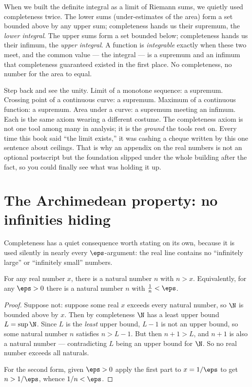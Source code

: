 When we built the definite integral as a limit of Riemann sums, we quietly used
completeness twice. The lower sums (under-estimates of the area) form a set bounded above
by any upper sum; completeness hands us their supremum, the \emph{lower integral}. The
upper sums form a set bounded below; completeness hands us their infimum, the \emph{upper
integral}. A function is \emph{integrable} exactly when these two meet, and the common
value --- the integral --- is a supremum and an infimum that completeness guaranteed
existed in the first place. No completeness, no number for the area to equal.

\begin{aestheticbox}
Step back and see the unity. Limit of a monotone sequence: a supremum. Crossing point of a
continuous curve: a supremum. Maximum of a continuous function: a supremum. Area under a
curve: a supremum meeting an infimum. Each is the same axiom wearing a different costume.
The completeness axiom is not one tool among many in analysis; it is the \emph{ground} the
tools rest on. Every time this book said ``the limit exists,'' it was cashing a cheque
written by this one sentence about ceilings. That is why an appendix on the real numbers is
not an optional postscript but the foundation slipped under the whole building after the
fact, so you could finally see what was holding it up.
\end{aestheticbox}

\section{The Archimedean property: no infinities hiding}
\label{ch41:archimedean}

Completeness has a quiet consequence worth stating on its own, because it is used silently
in nearly every $\eps$-argument: the real line contains no ``infinitely large'' or
``infinitely small'' numbers.

\begin{theorem}
\label{ch41:arch}
For any real number $x$, there is a natural number $n$ with $n > x$. Equivalently, for any
$\eps>0$ there is a natural number $n$ with $\frac1n < \eps$.
\end{theorem}

\begin{proof}
Suppose not: suppose some real $x$ exceeds every natural number, so $\N$ is bounded above
by $x$. Then by completeness $\N$ has a least upper bound $L=\sup\N$. Since $L$ is the
\emph{least} upper bound, $L-1$ is not an upper bound, so some natural number $n$ satisfies
$n > L-1$. But then $n+1 > L$, and $n+1$ is also a natural number --- contradicting $L$
being an upper bound for $\N$. So no real number exceeds all naturals.

For the second form, given $\eps>0$ apply the first part to $x=1/\eps$ to get $n>1/\eps$,
whence $1/n<\eps$.
\end{proof}

